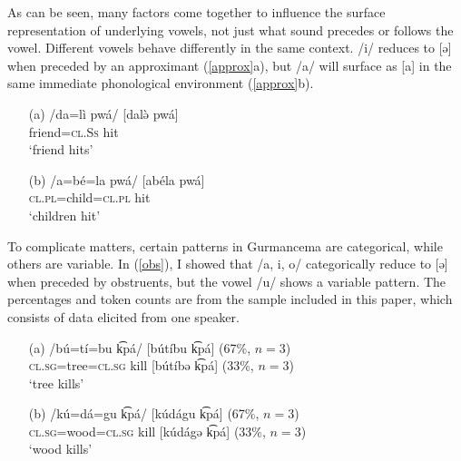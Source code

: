 \documentclass[output=paper,newtxmath,modfonts,nonflat,draftmode]{langsci/langscibook}
\begin{document}
As can be seen, many factors come together to influence the surface representation of underlying vowels, not just what sound precedes or follows the vowel. Different vowels behave differently in the same context. /i/ reduces to [ə] when preceded by an approximant (\ref{approx}a), but /a/ will surface as [a] in the same immediate phonological environment (\ref{approx}b). 

\ea \label{approx}
\begin{enumerate}
\item[(a)]
\gll /da=lì pwá/ \hspace{0.8cm} [dalə̀ pwá]\\
friend=\textsc{cl.Ss} hit\\
\glt `friend hits'

\item[(b)]
\gll /a=bé=la pwá/ \hspace{0.5cm} [abéla pwá]\\
\textsc{cl.pl}=child=\textsc{cl.pl} hit\\
\glt `children hit'

\end{enumerate}
\z

To complicate matters, certain patterns in Gurmancema are categorical, while others are variable. In (\ref{obs}), I showed that /a, i, o/ categorically reduce to [ə] when preceded by obstruents, but the vowel /u/ shows a variable pattern. The percentages and token counts are from the sample included in this paper, which consists of data elicited from one speaker. 

\ea \label{u}
\begin{enumerate}
\item[(a)]
\gll /bú=tí=bu k͡pá/  \hspace{0.6cm} [bútíbu k͡pá] (67\%, $n=3$) \\
 \textsc{cl.sg}=tree=\textsc{cl.sg} kill \hspace{0.5cm} [bútíbə k͡pá] (33\%, $n=3$)\\ 
\glt `tree kills'

\item[(b)]
\gll /kú=dá=gu k͡pá/  \hspace{0.5cm} [kúdágu k͡pá] (67\%, $n=3$) \\
 \textsc{cl.sg}=wood=\textsc{cl.sg} kill \hspace{0.5cm} [kúdágə k͡pá] (33\%, $n=3$)\\ 
\glt `wood kills'

\end{enumerate}
\z
\end{document}
